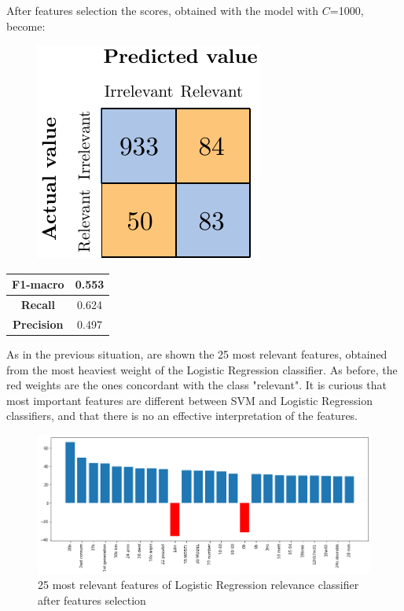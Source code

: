 After features selection the scores, obtained with the model with $C$=1000, become:

\begin{figure}[H]
	\centering
	\includegraphics[scale=1]{figures/conf_matrices/ita_rel_logreg/ita_rel_logreg_afs.pdf}
	\label{fig:ita_rel_logreg_afs}
\end{figure}

\begin{center}
	\begin{tabular}{ | c | c | } 
		\hline
		\textbf{F1-macro} & 0.553 \\
		\hline
		\textbf{Recall} & 0.624 \\ 
		\hline
		\textbf{Precision} & 0.497 \\ 
		\hline
	\end{tabular}
\end{center}

As in the previous situation, are shown the 25 most relevant features, obtained from the most heaviest weight of the Logistic Regression classifier. As before, the red weights are the ones concordant with the class "relevant". It is curious that most important features are different between SVM and Logistic Regression classifiers, and that there is no an effective interpretation of the features.

\begin{figure}[H]
	\centering
	\includegraphics[width=\textwidth]{figures/conf_matrices/ita_rel_logreg/logreg_rel_best_feat.png}
	\caption{25 most relevant features of Logistic Regression relevance classifier after features selection}
	\label{fig:ita_rel_logreg_feat}
\end{figure}

